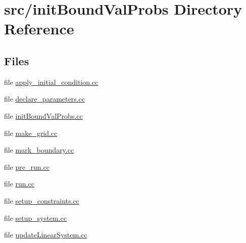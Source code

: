 \section{src/init\+Bound\+Val\+Probs Directory Reference}
\label{dir_2d09604be94b4570660f815b8c136696}
\subsection*{Files}
\begin{DoxyCompactItemize}
\item 
file \mbox{\hyperlink{apply__initial__condition_8cc}{apply\+\_\+initial\+\_\+condition.\+cc}}
\item 
file \mbox{\hyperlink{init_bound_val_probs_2declare__parameters_8cc}{declare\+\_\+parameters.\+cc}}
\item 
file \mbox{\hyperlink{init_bound_val_probs_8cc}{init\+Bound\+Val\+Probs.\+cc}}
\item 
file \mbox{\hyperlink{make__grid_8cc}{make\+\_\+grid.\+cc}}
\item 
file \mbox{\hyperlink{mark__boundary_8cc}{mark\+\_\+boundary.\+cc}}
\item 
file \mbox{\hyperlink{pre__run_8cc}{pre\+\_\+run.\+cc}}
\item 
file \mbox{\hyperlink{run_8cc}{run.\+cc}}
\item 
file \mbox{\hyperlink{setup__constraints_8cc}{setup\+\_\+constraints.\+cc}}
\item 
file \mbox{\hyperlink{setup__system_8cc}{setup\+\_\+system.\+cc}}
\item 
file \mbox{\hyperlink{update_linear_system_8cc}{update\+Linear\+System.\+cc}}
\end{DoxyCompactItemize}
